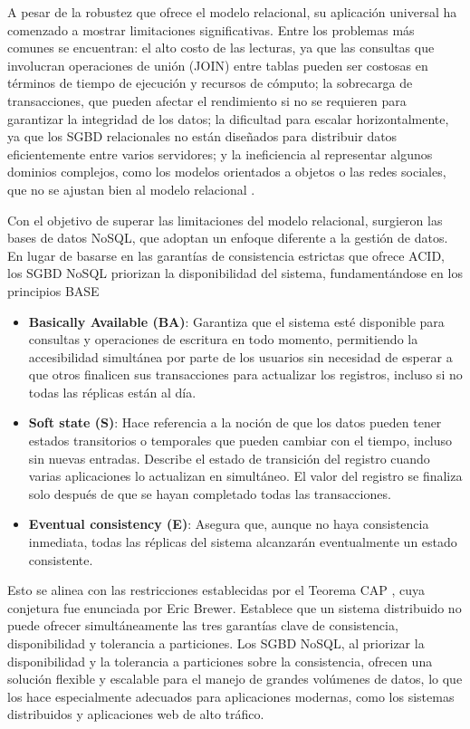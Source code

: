 A pesar de la robustez que ofrece el modelo relacional, su aplicación universal 
ha comenzado a mostrar limitaciones significativas. Entre los problemas más comunes 
se encuentran: el alto costo de las lecturas, ya que las consultas que involucran 
operaciones de unión (JOIN) entre tablas pueden ser costosas en términos de tiempo 
de ejecución y recursos de cómputo; la sobrecarga de transacciones, que pueden afectar 
el rendimiento si no se requieren para garantizar la integridad de los datos; 
la dificultad para escalar horizontalmente, ya que los SGBD relacionales no están 
diseñados para distribuir datos eficientemente entre varios servidores; y la ineficiencia 
al representar algunos dominios complejos, como los modelos orientados a objetos o 
las redes sociales, que no se ajustan bien al modelo relacional \cite{Camacho}.

Con el objetivo de superar las limitaciones del modelo relacional, surgieron 
las bases de datos NoSQL, que adoptan un enfoque diferente a la gestión de datos. 
En lugar de basarse en las garantías de consistencia estrictas que ofrece ACID, 
los SGBD NoSQL priorizan la disponibilidad del sistema, fundamentándose en los 
principios BASE \cite{AWS}

\begin{itemize}
    \item \textbf{Basically Available (BA)}: Garantiza que el sistema esté disponible 
    para consultas y operaciones de escritura en todo momento, permitiendo la accesibilidad 
    simultánea por parte de los usuarios sin necesidad de esperar a que otros finalicen 
    sus transacciones para actualizar los registros, incluso si no todas las réplicas 
    están al día.
    \item \textbf{Soft state (S)}: Hace referencia a la noción de que los datos pueden 
    tener estados transitorios o temporales que pueden cambiar con el tiempo, incluso 
    sin nuevas entradas. Describe el estado de transición del registro cuando varias 
    aplicaciones lo actualizan en simultáneo. El valor del registro se finaliza solo 
    después de que se hayan completado todas las transacciones. 
    \item \textbf{Eventual consistency (E)}: Asegura que, aunque no haya consistencia 
    inmediata, todas las réplicas del sistema alcanzarán eventualmente un estado consistente.
\end{itemize}

Esto se alinea con las restricciones establecidas por el Teorema CAP \cite{CAP}, 
cuya conjetura fue enunciada por Eric Brewer. Establece que un sistema distribuido 
no puede ofrecer simultáneamente las tres garantías clave de consistencia, disponibilidad 
y tolerancia a particiones. Los SGBD NoSQL, al priorizar la disponibilidad y la tolerancia 
a particiones sobre la consistencia, ofrecen una solución flexible y escalable para el manejo 
de grandes volúmenes de datos, lo que los hace especialmente adecuados para aplicaciones 
modernas, como los sistemas distribuidos y aplicaciones web de alto tráfico.

